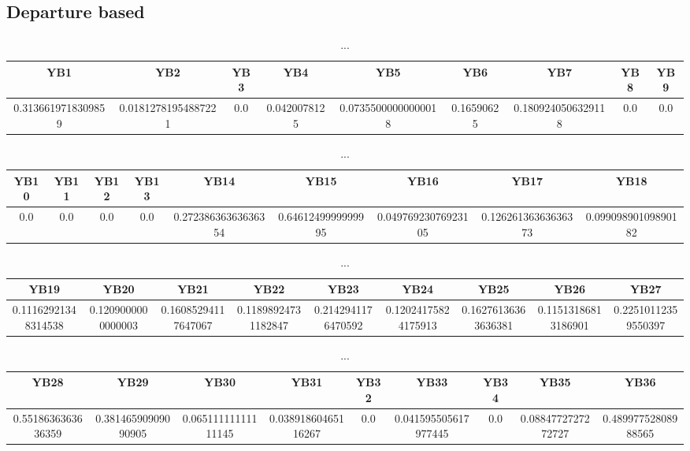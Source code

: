 \documentclass[]{article}
\begin{document}
\subsection{Departure based}
\begin{table}[h]
      \centering
      \begin{tabular}{|c|c|c|c|c|c|c|c|c|}
            \hline
            YB1                & YB2                 & YB3 & YB4          & YB5                 & YB6        & YB7                & YB8 & YB9 \\
            \hline
            0.3136619718309859 & 0.01812781954887221 & 0.0 & 0.0420078125 & 0.07355000000000018 & 0.16590625 & 0.1809240506329118 & 0.0 & 0.0 \\
            \hline
      \end{tabular}
      \caption{...}
\end{table}
\begin{table}[h]
      \centering
      \begin{tabular}{|c|c|c|c|c|c|c|c|c|}
            \hline
            YB10 & YB11 & YB12 & YB13 & YB14                & YB15               & YB16                & YB17                & YB18                \\
            \hline
            0.0  & 0.0  & 0.0  & 0.0  & 0.27238636363636354 & 0.6461249999999995 & 0.04976923076923105 & 0.12626136363636373 & 0.09909890109890182 \\
            \hline
      \end{tabular}
      \caption{...}
\end{table}
\begin{table}[h]
      \centering
      \begin{tabular}{|c|c|c|c|c|c|c|c|c|}
            \hline
            YB19                & YB20               & YB21                & YB22                & YB23               & YB24                & YB25                & YB26                & YB27                \\
            \hline
            0.11162921348314538 & 0.1209000000000003 & 0.16085294117647067 & 0.11898924731182847 & 0.2142941176470592 & 0.12024175824175913 & 0.16276136363636381 & 0.11513186813186901 & 0.22510112359550397 \\
            \hline
      \end{tabular}
      \caption{...}
\end{table}
\begin{table}[h]
      \centering
      \begin{tabular}{|c|c|c|c|c|c|c|c|c|}
            \hline
            YB28               & YB29                & YB30                & YB31                & YB32 & YB33                 & YB34 & YB35               & YB36                \\
            \hline
            0.5518636363636359 & 0.38146590909090905 & 0.06511111111111145 & 0.03891860465116267 & 0.0  & 0.041595505617977445 & 0.0  & 0.0884772727272727 & 0.48997752808988565 \\
            \hline
      \end{tabular}
      \caption{...}
\end{table}
\end{document}
